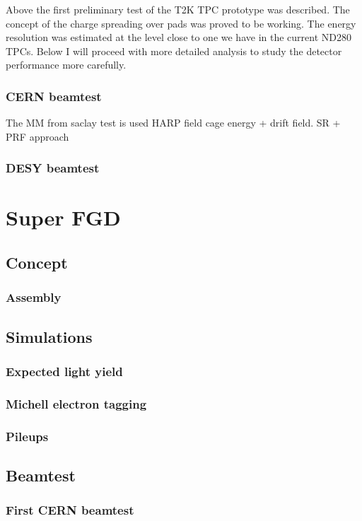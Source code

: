 \documentclass[../main.tex]{subfiles}
\begin{document}
Above the first preliminary test of the T2K TPC prototype was described. The concept of the charge spreading over pads was proved to be working. The energy resolution was estimated at the level close to one we have in the current ND280 TPCs. Below I will proceed with more detailed analysis to study the detector performance more carefully.

\subsection{CERN beamtest}
The MM from saclay test is used
HARP field cage
energy + drift field.
SR + PRF approach

\subsection{DESY beamtest}


\chapter{Super FGD}
\label{ch:up:sfgd}
\section{Concept}
\subsection{Assembly}
\section{Simulations}
\subsection{Expected light yield}
\subsection{Michell electron tagging}
\subsection{Pileups}
\section{Beamtest}
\subsection{First CERN beamtest}
\end{document}

